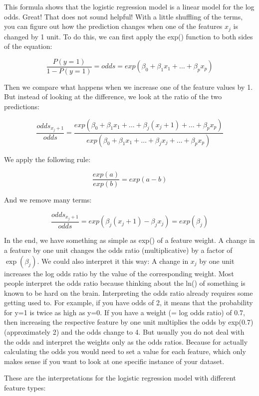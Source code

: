 \documentclass[
  11pt,
]{scrbook}
\begin{document}
This formula shows that the logistic regression model is a linear model for the log odds.
Great!
That does not sound helpful!
With a little shuffling of the terms, you can figure out how the prediction changes when one of the features \(x_j\) is changed by 1 unit.
To do this, we can first apply the exp() function to both sides of the equation:

\[\frac{P(y=1)}{1-P(y=1)}=odds=exp\left(\beta_{0}+\beta_{1}x_{1}+\ldots+\beta_{p}x_{p}\right)\]

Then we compare what happens when we increase one of the feature values by 1.
But instead of looking at the difference, we look at the ratio of the two predictions:

\[\frac{odds_{x_j+1}}{odds}=\frac{exp\left(\beta_{0}+\beta_{1}x_{1}+\ldots+\beta_{j}(x_{j}+1)+\ldots+\beta_{p}x_{p}\right)}{exp\left(\beta_{0}+\beta_{1}x_{1}+\ldots+\beta_{j}x_{j}+\ldots+\beta_{p}x_{p}\right)}\]

We apply the following rule:

\[\frac{exp(a)}{exp(b)}=exp(a-b)\]

And we remove many terms:

\[\frac{odds_{x_j+1}}{odds}=exp\left(\beta_{j}(x_{j}+1)-\beta_{j}x_{j}\right)=exp\left(\beta_j\right)\]

In the end, we have something as simple as exp() of a feature weight.
A change in a feature by one unit changes the odds ratio (multiplicative) by a factor of \(\exp(\beta_j)\).
We could also interpret it this way:
A change in \(x_j\) by one unit increases the log odds ratio by the value of the corresponding weight.
Most people interpret the odds ratio because thinking about the ln() of something is known to be hard on the brain.
Interpreting the odds ratio already requires some getting used to.
For example, if you have odds of 2, it means that the probability for y=1 is twice as high as y=0.
If you have a weight (= log odds ratio) of 0.7, then increasing the respective feature by one unit multiplies the odds by exp(0.7) (approximately 2) and the odds change to 4.
But usually you do not deal with the odds and interpret the weights only as the odds ratios.
Because for actually calculating the odds you would need to set a value for each feature, which only makes sense if you want to look at one specific instance of your dataset.

These are the interpretations for the logistic regression model with different feature types:
\end{document}

